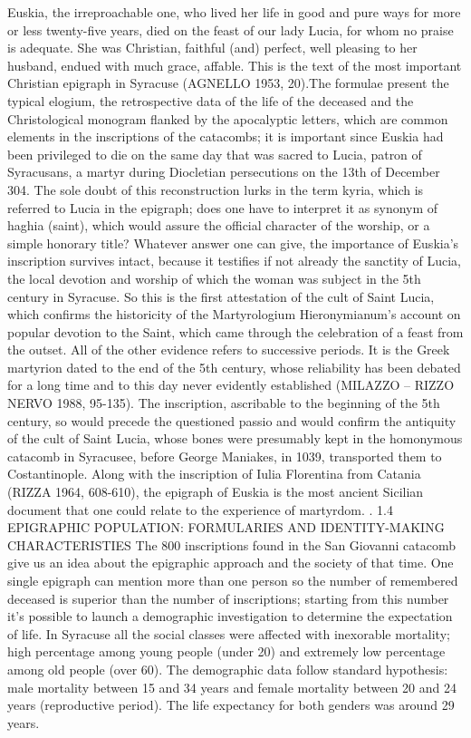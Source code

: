 \documentclass[amsthm,ebook]{saparticle}
\begin{document}
Euskia, the irreproachable one, who lived her life in good and pure ways for more or less twenty-five years, died on the feast of our lady Lucia, for whom no praise is adequate. She was Christian, faithful (and) perfect, well pleasing to her husband, endued with much grace, affable.
This is the text of the most important Christian epigraph in Syracuse (AGNELLO 1953, 20).The formulae present the typical elogium, the retrospective data of the life of the deceased and the Christological monogram flanked by the apocalyptic letters, which are common elements in the inscriptions of the catacombs; it is important since Euskia had been privileged to die on the same day that was sacred to Lucia, patron of Syracusans, a martyr during Diocletian persecutions on the 13th of December 304. The sole doubt of this reconstruction lurks in the term kyria, which is referred to Lucia in the epigraph; does one have to interpret it as synonym of haghia (saint), which would assure the official character of the worship, or a simple honorary title? Whatever answer one can give, the importance of Euskia’s inscription survives intact, because it testifies if not already the sanctity of Lucia, the local devotion and worship of which the woman was subject in the 5th century in Syracuse.
So this is the first attestation of the cult of Saint Lucia, which confirms the historicity of the Martyrologium Hieronymianum’s account on popular devotion to the Saint, which came through the celebration of a feast from the outset. All of the other evidence refers to successive periods. It is the Greek martyrion dated to the end of the 5th century, whose reliability has been debated for a long time and to this day never evidently established (MILAZZO – RIZZO NERVO 1988, 95-135). The inscription, ascribable to the beginning of the 5th century, so would precede the questioned passio and would confirm the antiquity of the cult of Saint Lucia, whose bones were presumably kept in the homonymous catacomb in Syracusee, before George Maniakes, in 1039, transported them to Costantinople. Along with
the inscription of Iulia Florentina from Catania (RIZZA 1964, 608-610), the epigraph of Euskia is the most ancient Sicilian document that one could relate to the experience of martyrdom.
. 1.4 EPIGRAPHIC POPULATION: FORMULARIES AND IDENTITY-MAKING CHARACTERISTIES
The 800 inscriptions found in the San Giovanni catacomb give us an idea about the epigraphic approach and the society of that time. One single epigraph can mention more than one person so the number of remembered deceased is superior than the number of inscriptions; starting from this number it’s possible to launch a demographic investigation to determine the expectation of life.
In Syracuse all the social classes were affected with inexorable mortality; high percentage among young people (under 20) and extremely low percentage among old people (over 60). The demographic data follow standard hypothesis: male mortality between 15 and 34 years and female mortality between 20 and 24 years (reproductive period). The life expectancy for both genders was around 29 years.
\end{document}
